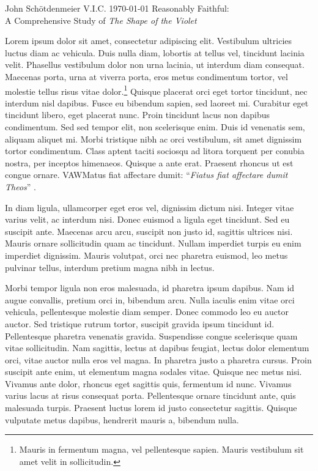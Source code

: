 \documentclass[12pt]{article}
\begin{document}
\begin{mla}
    {John}
    {Schötdenmeier}
    {V.I.C.}
    {\today}
    {Reasonably Faithful: \\
        A Comprehensive Study of \emph{The Shape of the Violet}}

Lorem ipsum dolor sit amet, consectetur adipiscing elit. Vestibulum ultricies luctus diam ac vehicula. Duis nulla diam, lobortis at tellus vel, tincidunt lacinia velit. Phasellus vestibulum dolor non urna lacinia, ut interdum diam consequat. Maecenas porta, urna at viverra porta, eros metus condimentum tortor, vel molestie tellus risus vitae dolor.\footnote{Mauris in fermentum magna, vel pellentesque sapien. Mauris vestibulum sit amet velit in sollicitudin.} Quisque placerat orci eget tortor tincidunt, nec interdum nisl dapibus. Fusce eu bibendum sapien, sed laoreet mi. Curabitur eget tincidunt libero, eget placerat nunc. Proin tincidunt lacus non dapibus condimentum. Sed sed tempor elit, non scelerisque enim. Duis id venenatis sem, aliquam aliquet mi. Morbi tristique nibh ac orci vestibulum, sit amet dignissim tortor condimentum. Class aptent taciti sociosqu ad litora torquent per conubia nostra, per inceptos himenaeos. Quisque a ante erat. Praesent rhoncus ut est congue ornare. VAWMatus fiat affectare dumit: ``\emph{Fiatus fiat affectare dumit Theos}'' \parencite[323]{eco83}.

In diam ligula, ullamcorper eget eros vel, dignissim dictum nisi. Integer vitae varius velit, ac interdum nisi. Donec euismod a ligula eget tincidunt. Sed eu suscipit ante. Maecenas arcu arcu, suscipit non justo id, sagittis ultrices nisi. Mauris ornare sollicitudin quam ac tincidunt. Nullam imperdiet turpis eu enim imperdiet dignissim. Mauris volutpat, orci nec pharetra euismod, leo metus pulvinar tellus, interdum pretium magna nibh in lectus.

Morbi tempor ligula non eros malesuada, id pharetra ipsum dapibus. Nam id augue convallis, pretium orci in, bibendum arcu. Nulla iaculis enim vitae orci vehicula, pellentesque molestie diam semper. Donec commodo leo eu auctor auctor. Sed tristique rutrum tortor, suscipit gravida ipsum tincidunt id. Pellentesque pharetra venenatis gravida. Suspendisse congue scelerisque quam vitae sollicitudin. Nam sagittis, lectus at dapibus feugiat, lectus dolor elementum orci, vitae auctor nulla eros vel magna. In pharetra justo a pharetra cursus. Proin suscipit ante enim, ut elementum magna sodales vitae. Quisque nec metus nisi. Vivamus ante dolor, rhoncus eget sagittis quis, fermentum id nunc. Vivamus varius lacus at risus consequat porta. Pellentesque ornare tincidunt ante, quis malesuada turpis. Praesent luctus lorem id justo consectetur sagittis. Quisque vulputate metus dapibus, hendrerit mauris a, bibendum nulla.


\end{mla}
\end{document}
